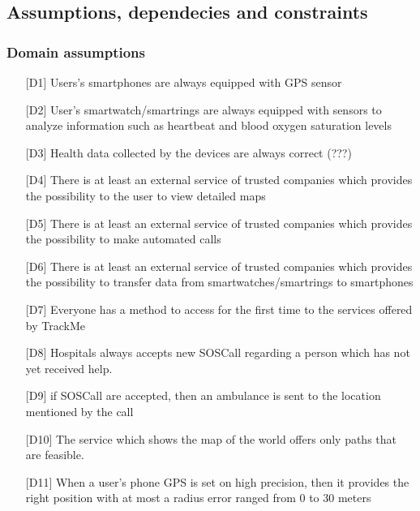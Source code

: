 \subsection{Assumptions, dependecies and constraints}

\subsubsection{Domain assumptions}
\begin{itemize}
\item[{[D1]}]  Users's smartphones are always equipped with GPS sensor
\item[{[D2]}] User's smartwatch/smartrings are always equipped with sensors to analyze information such as heartbeat and blood oxygen saturation levels
\item[{[D3]}] Health data collected by the devices are always correct (???)
\item[{[D4]}] There is at least an external service of trusted companies which provides the possibility to the user to view detailed maps
\item[{[D5]}] There is at least an external service of trusted companies which provides the possibility to make automated calls
\item[{[D6]}] There is at least an external service of trusted companies which provides the possibility to transfer data from smartwatches/smartrings to smartphones
\item[{[D7]}] Everyone has a method to access for the first time to the services offered by TrackMe
\item[{[D8]}] Hospitals always accepts new SOSCall regarding a person which has not yet received help.
\item[{[D9]}] if SOSCall are accepted, then an ambulance is sent to the location mentioned by the call
\item[{[D10]}] The service which shows the map of the world offers only paths that are feasible.
\item[{[D11]}] When a user's phone GPS is set on high precision, then it provides the right position with at most a radius error ranged from 0 to 30 meters
\end{itemize}
